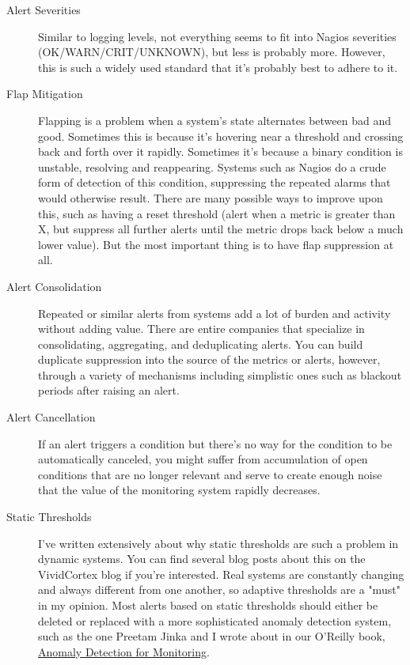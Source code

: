 \documentclass{vivid_layout}
\begin{document}
\begin{description}

\item[Alert Severities] Similar to logging levels, not everything seems to fit
into Nagios severities (OK/WARN/CRIT/UNKNOWN), but less is probably more.
However, this is such a widely used standard that it's probably best to adhere
to it.

\item[Flap Mitigation] Flapping is a problem when a system's state alternates
between bad and good. Sometimes this is because it's hovering near a threshold
and crossing back and forth over it rapidly. Sometimes it's because a binary
condition is unstable, resolving and reappearing. Systems such as Nagios do a
crude form of detection of this condition, suppressing the repeated alarms that
would otherwise result. There are many possible ways to improve upon this, such
as having a reset threshold (alert when a metric is greater than X, but suppress
all further alerts until the metric drops back below a much lower value). But
the most important thing is to have flap suppression at all.

\item[Alert Consolidation] Repeated or similar alerts from systems add a lot of burden
and activity without adding value. There are entire companies that specialize in
consolidating, aggregating, and deduplicating alerts. You can build duplicate
suppression into the source of the metrics or alerts, however, through a variety
of mechanisms including simplistic ones such as blackout periods after raising an
alert.

\item[Alert Cancellation] If an alert triggers a condition but there's no way for the
condition to be automatically canceled, you might suffer from accumulation of
open conditions that are no longer relevant and serve to create enough noise
that the value of the monitoring system rapidly decreases.

\item[Static Thresholds] I've written extensively about why static thresholds
are such a problem in dynamic systems. You can find several blog posts about
this on the VividCortex blog if you're interested. Real systems are constantly
changing and always different from one another, so adaptive thresholds are a
"must" in my opinion. Most alerts based on static thresholds should either be
deleted or replaced with a more sophisticated anomaly detection system, such as
the one Preetam Jinka and I wrote about in our O'Reilly book,
\href{https://www.vividcortex.com/blog/anomaly-detection-for-monitoring-a-new-ebook-in-collaboration-with-oreilly-and-ruxit}{Anomaly
Detection for Monitoring}.


\end{description}
\end{document}
